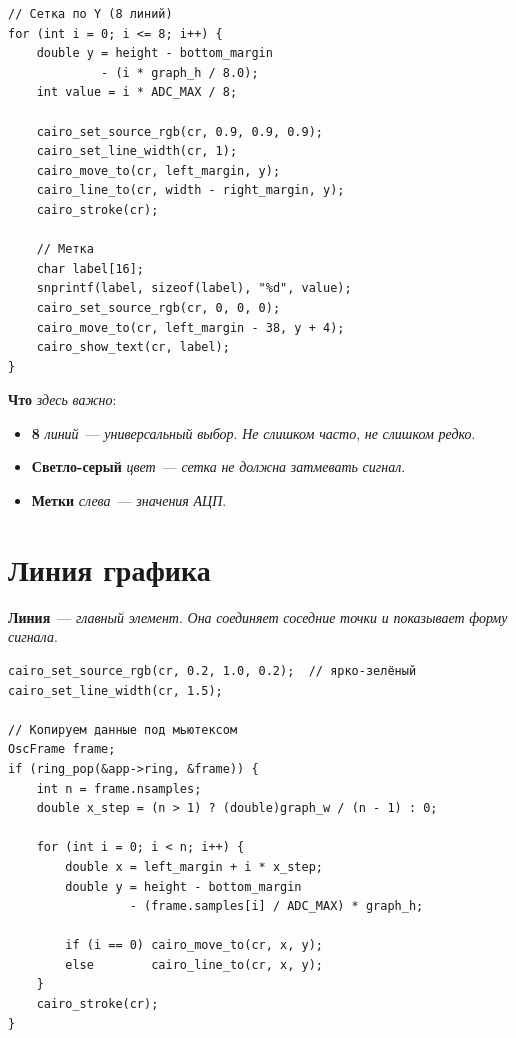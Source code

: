 \begin{listing}[htbp]
\begin{verbatim}
// Сетка по Y (8 линий)
for (int i = 0; i <= 8; i++) {
    double y = height - bottom_margin
             - (i * graph_h / 8.0);
    int value = i * ADC_MAX / 8;

    cairo_set_source_rgb(cr, 0.9, 0.9, 0.9);
    cairo_set_line_width(cr, 1);
    cairo_move_to(cr, left_margin, y);
    cairo_line_to(cr, width - right_margin, y);
    cairo_stroke(cr);

    // Метка
    char label[16];
    snprintf(label, sizeof(label), "%d", value);
    cairo_set_source_rgb(cr, 0, 0, 0);
    cairo_move_to(cr, left_margin - 38, y + 4);
    cairo_show_text(cr, label);
}
\end{verbatim}
\caption{Сетка по Y}
\label{lst:render-grid-y}
\end{listing}

\textbf{Что} \emph{здесь} \emph{важно}:
\begin{itemize}
    \item \textbf{8} \emph{линий}~--- \emph{универсальный}
          \emph{выбор}. \emph{Не} \emph{слишком} \emph{часто},
          \emph{не} \emph{слишком} \emph{редко}.
    \item \textbf{Светло-серый} \emph{цвет}~--- \emph{сетка}
          \emph{не} \emph{должна} \emph{затмевать} \emph{сигнал}.
    \item \textbf{Метки} \emph{слева}~--- \emph{значения}
          \emph{АЦП}.
\end{itemize}

\section{Линия графика}
\label{sec:render-line}

\textbf{Линия}~--- \emph{главный} \emph{элемент}. \emph{Она}
\emph{соединяет} \emph{соседние} \emph{точки} \emph{и}
\emph{показывает} \emph{форму} \emph{сигнала}.

\begin{listing}[htbp]
\begin{verbatim}
cairo_set_source_rgb(cr, 0.2, 1.0, 0.2);  // ярко-зелёный
cairo_set_line_width(cr, 1.5);

// Копируем данные под мьютексом
OscFrame frame;
if (ring_pop(&app->ring, &frame)) {
    int n = frame.nsamples;
    double x_step = (n > 1) ? (double)graph_w / (n - 1) : 0;

    for (int i = 0; i < n; i++) {
        double x = left_margin + i * x_step;
        double y = height - bottom_margin
                 - (frame.samples[i] / ADC_MAX) * graph_h;

        if (i == 0) cairo_move_to(cr, x, y);
        else        cairo_line_to(cr, x, y);
    }
    cairo_stroke(cr);
}
\end{verbatim}
\caption{Линия графика}
\label{lst:render-line}
\end{listing}

